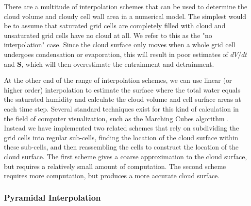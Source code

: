 \documentclass[12pt]{article}
\begin{document}
There are a multitude of interpolation schemes that can be used to determine 
the cloud volume and cloudy cell wall area in a numerical model.  The simplest 
would be to assume that saturated grid cells are completely filled with cloud 
and unsaturated grid cells have no cloud at all.  We refer to this as the "no 
interpolation" case.  Since the cloud surface only moves when a whole grid cell 
undergoes condensation or evaporation, this will result in poor estimates of 
$dV/dt$ and $\mathbf{S}$, which will then overestimate the entrainment and 
detrainment.

At the other end of the range of interpolation schemes, we can use linear (or 
higher order) interpolation to estimate the surface where the total water 
equals the saturated humidity and calculate the cloud volume and cell surface 
areas at each time step.  Several standard techniques exist for this kind of 
calculation in the field of computer visualization, such as the Marching 
Cubes algorithm \citep{Lorensen1987}.  Instead we have implemented two related 
schemes that rely on subdividing the grid cells into regular sub-cells, finding 
the location of the cloud surface within these sub-cells, and then reassembling 
the cells to construct the location of the cloud surface.  The first scheme 
gives a coarse approximation to the cloud surface, but requires a relatively 
small amount of computation.  The second scheme requires more computation, but 
produces a more accurate cloud surface.


\subsubsection{Pyramidal Interpolation}
\end{document}
